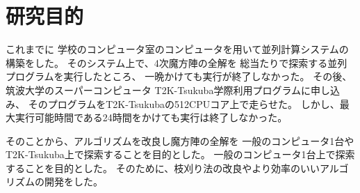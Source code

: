 \section{研究目的}
これまでに
学校のコンピュータ室のコンピュータを用いて並列計算システムの構築をした。
そのシステム上で、4次魔方陣の全解を
総当たりで探索する並列プログラムを実行したところ、
一晩かけても実行が終了しなかった。
その後、筑波大学のスーパーコンピュータ
T2K-Tsukuba学際利用プログラムに申し込み、
そのプログラムをT2K-Tsukubaの512CPUコア上で走らせた。
しかし、最大実行可能時間である24時間をかけても実行は終了しなかった。

そのことから、アルゴリズムを改良し魔方陣の全解を
一般のコンピュータ1台やT2K-Tsukuba上で探索することを目的とした。
一般のコンピュータ1台上で探索することを目的とした。
そのために、枝刈り法の改良やより効率のいいアルゴリズムの開発をした。
